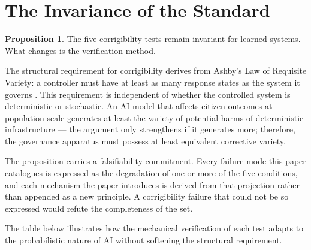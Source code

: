 \documentclass{article}
\theoremstyle{definition}
\newtheorem{proposition}{Proposition}[section]
\begin{document}

\section{The Invariance of the Standard}
\label{sec:invariance}

\begin{proposition}
The five corrigibility tests remain invariant for learned systems. What changes is the verification method.
\end{proposition}

The structural requirement for corrigibility derives from Ashby's Law of Requisite Variety: a controller must have at least as many response states as the system it governs \citep{ashby1956}. This requirement is independent of whether the controlled system is deterministic or stochastic. An AI model that affects citizen outcomes at population scale generates at least the variety of potential harms of deterministic infrastructure --- the argument only strengthens if it generates more; therefore, the governance apparatus must possess at least equivalent corrective variety.

The proposition carries a falsifiability commitment. Every failure mode this paper catalogues is expressed as the degradation of one or more of the five conditions, and each mechanism the paper introduces is derived from that projection rather than appended as a new principle. A corrigibility failure that could not be so expressed would refute the completeness of the set.

The table below illustrates how the mechanical verification of each test adapts to the probabilistic nature of AI without softening the structural requirement.
\end{document}
